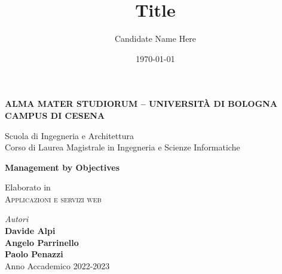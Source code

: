\title{Title}
\author{Candidate Name Here}
\date{\today}

\begin{titlepage}
	\begin{center}
		
		\large
		\textbf{ALMA MATER STUDIORUM -- UNIVERSITÀ DI BOLOGNA \\ CAMPUS DI CESENA}
		\\
		\noindent\hrulefill
		\vspace{0.4cm}
		
		\Large
		Scuola di Ingegneria e Architettura \\
		Corso di Laurea Magistrale in Ingegneria e Scienze Informatiche
		
		\Huge
		\vspace{4cm}
		\textbf{
			Management by Objectives
			\\
		}
		
		\large
		\vspace{1cm}
		Elaborato in 
		\\
		\textsc{Applicazioni e servizi web}
		
		\vspace{5.5cm}
		\textit{Autori} 
				\\ 
				\textbf{Davide Alpi}
				\\
				\textbf{Angelo Parrinello}
				\\
				\textbf{Paolo Penazzi}
		\vfill
		\noindent\hrulefill
		\vspace{0.3cm}
		\Large
		\\
		Anno Accademico 2022-2023
	\end{center}
\end{titlepage}
\restoregeometry